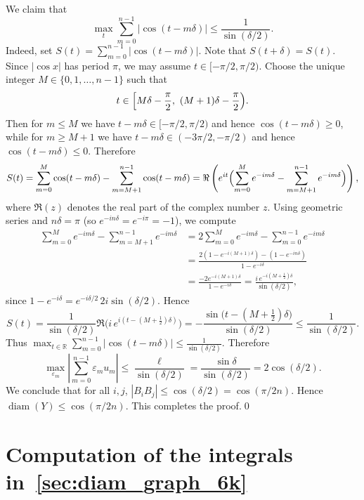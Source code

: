 \documentclass{article}
\DeclareMathOperator{\diam}{diam}
\theoremstyle{definition}
\let\le\leqslant
\let\ge\geqslant
\let\leq\leqslant
\begin{document}
We claim that
\[
\max_{t}
\sum_{m=0}^{n-1}
|\cos(t-m\delta)|
\leq 
\frac{1}{\sin(\delta/2)}.
\]
Indeed, set \(S(t)=\sum_{m=0}^{n-1}\bigl|\cos(t-m\delta)\bigr|\). Note that $S(t+\delta)=S(t)$. Since $|\cos x|$ has period $\pi$, we may assume $t\in[-\pi/2,\pi/2)$.
Choose the unique integer $M\in\{0,1,\dots,n-1\}$ such that
\[
t\in\Bigl[M\delta-\frac{\pi}{2},\ (M+1)\delta-\frac{\pi}{2}\Bigr).
\]
Then for $m\le M$ we have $t-m\delta\in[-\pi/2,\pi/2)$ and hence $\cos(t-m\delta)\ge0$,
while for $m\ge M+1$ we have $t-m\delta\in(-3\pi/2,-\pi/2)$ and hence $\cos(t-m\delta)\le0$. Therefore
\[
S(t)=\sum_{m=0}^{M}\cos(t-m\delta)-\sum_{m=M+1}^{n-1}\cos(t-m\delta)
=\Re\left(e^{it}\Bigl(\sum_{m=0}^{M}e^{-im\delta}-\sum_{m=M+1}^{n-1}e^{-im\delta}\Bigr)\right),
\]where $\Re(z)$ denotes the real part of the complex number $z$. Using geometric series and $n\delta=\pi$ (so $e^{-in\delta}=e^{-i\pi}=-1$), we compute
\begin{align*}
\sum_{m=0}^{M}e^{-im\delta}-\sum_{m=M+1}^{n-1}e^{-im\delta}
&=2\sum_{m=0}^{M}e^{-im\delta}-\sum_{m=0}^{n-1}e^{-im\delta}\\
&=\frac{2(1-e^{-i(M+1)\delta})-(1-e^{-in\delta})}{1-e^{-i\delta}}
\\
&=\frac{-2e^{-i(M+1)\delta}}{1-e^{-i\delta}}=\frac{i\,e^{-i(M+\frac12)\delta}}{\sin(\delta/2)},
\end{align*}
since $1-e^{-i\delta}=e^{-i\delta/2}\,2i\sin(\delta/2)$. Hence
\[
S(t)=\frac{1}{\sin(\delta/2)} \Re \bigl(i\,e^{i(t-(M+\frac12)\delta)}\bigr)
=-\frac{\sin \bigl(t-(M+\frac12)\delta\bigr)}{\sin(\delta/2)}
\le \frac{1}{\sin(\delta/2)}.
\]Thus \(\max_{t\in\mathbb R} \sum_{m=0}^{n-1}\bigl|\cos(t-m\delta)\bigr| \leq \frac{1}{\sin(\delta/2)}\). Therefore
\[
\max_{\varepsilon_m}
\left|
\sum_{m=0}^{n-1}
\varepsilon_m u_m
\right|
\leq
\frac{\ell}{\sin(\delta/2)}
=
\frac{\sin\delta}{\sin(\delta/2)}
=
2\cos(\delta/2).
\]
We conclude that for all $i,j$, \(|B_iB_j|
\le
\cos(\delta/2)
=
\cos(\pi/2n)\). Hence \(\diam(Y)\leq \cos(\pi/2n)\). This completes the proof.\qed
























\section{Computation of the integrals in~\cref{sec:diam_graph_6k} }\label{app:AnIntegral}
\end{document}
